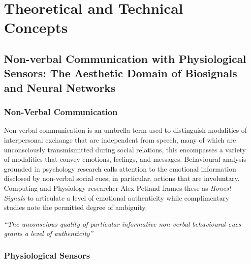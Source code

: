 

\chapter{Theoretical and Technical Concepts}
\label{cha:technical_concepts}

\section{Non-verbal Communication with Physiological Sensors: The Aesthetic Domain of Biosignals and Neural Networks}
\label{subsec:title}


\subsection{Non-Verbal Communication}

Non-verbal communication is an umbrella term used to distinguish modalities of interpersonal exchange that are independent from speech, many of which are unconsciously transmismitted during social relations, this encompasses a variety of modalities that convey emotions, feelings, and messages. Behavioural analysis grounded in psychology research calls attention to the emotional information disclosed by non-verbal social cues, in particular, actions that are involuntary. Computing and Physiology researcher Alex Petland frames these as \textit{Honest Signals} to articulate a level of emotional authenticity while complimentary studies note the permitted degree of ambiguity.

\textit{“The unconscious quality of particular informative non-verbal behavioural cues grants a level of authenticity”}
 \cite{pentland_honest_2010}

\subsection{Physiological Sensors}

